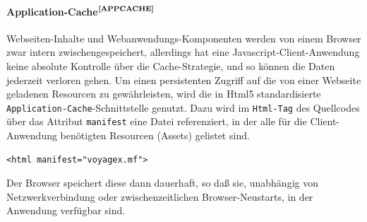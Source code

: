 \paragraph{Application-Cache$^{\textbf{\ref{APPCACHE}}}$}
\addtocounter{footnote}{1}%
Webseiten-Inhalte und Webanwendungs-Komponenten werden von einem Browser zwar intern zwischengespeichert, allerdings hat eine Javascript-Client-Anwendung keine absolute Kontrolle über die Cache-Strategie, und so können die Daten jederzeit verloren gehen. Um einen persistenten Zugriff auf die von einer Webseite geladenen Resourcen zu gewährleisten, wird die in Html5 standardisierte \texttt{Application-Cache}-Schnittstelle genutzt. Dazu wird im \texttt{Html-Tag} des Quellcodes über das Attribut \texttt{manifest} eine Datei referenziert, in der alle für die Client-Anwendung benötigten Resourcen (Assets) gelistet sind.
\lstset{language=Html}
\begin{lstlisting}[frame=single,numbers=none,xleftmargin=0pt]
<html manifest="voyagex.mf">
\end{lstlisting}%
Der Browser speichert diese dann dauerhaft, so daß sie, unabhängig von Netzwerkverbindung oder zwischenzeitlichen Browser-Neustarts, in der Anwendung verfügbar sind.\\
